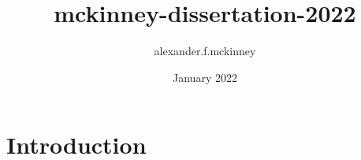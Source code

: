 \documentclass{article}
\title{mckinney-dissertation-2022}
\author{alexander.f.mckinney }
\date{January 2022}
\begin{document}
\maketitle

\section{Introduction}
\end{document}
